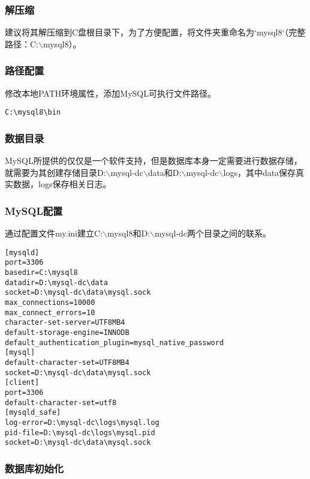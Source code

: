 \documentclass[12pt, openany, oneside]{book}
\begin{document}
\subsubsection{解压缩}

建议将其解压缩到C盘根目录下，为了方便配置，将文件夹重命名为`mysql8`（完整路径：C:$ \backslash $mysql8）。

\subsubsection{路径配置}

修改本地PATH环境属性，添加MySQL可执行文件路径。

\vspace{-0.5cm}

\begin{lstlisting}
C:\mysql8\bin
\end{lstlisting}

\subsubsection{数据目录}

MySQL所提供的仅仅是一个软件支持，但是数据库本身一定需要进行数据存储，就需要为其创建存储目录D:$ \backslash $mysql-dc$ \backslash $data和D:$ \backslash $mysql-dc$ \backslash $logs，其中data保存真实数据，logs保存相关日志。

\subsubsection{MySQL配置}

通过配置文件my.ini建立C:$ \backslash $mysql8和D:$ \backslash $mysql-dc两个目录之间的联系。\\


\begin{lstlisting}
[mysqld]
port=3306
basedir=C:\mysql8
datadir=D:\mysql-dc\data
socket=D:\mysql-dc\data\mysql.sock
max_connections=10000
max_connect_errors=10
character-set-server=UTF8MB4
default-storage-engine=INNODB
default_authentication_plugin=mysql_native_password
[mysql]
default-character-set=UTF8MB4
socket=D:\mysql-dc\data\mysql.sock
[client]
port=3306
default-character-set=utf8
[mysqld_safe]
log-error=D:\mysql-dc\logs\mysql.log
pid-file=D:\mysql-dc\logs\mysql.pid
socket=D:\mysql-dc\data\mysql.sock
\end{lstlisting}

\subsubsection{数据库初始化}
\end{document}
